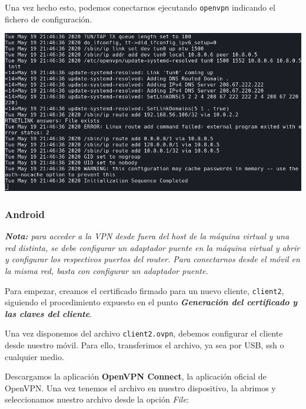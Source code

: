 \documentclass[11pt,a4paper]{article}
\begin{document}
\medskip

Una vez hecho esto, podemos conectarnos ejecutando \texttt{openvpn} indicando el fichero de configuración.

\medskip

\begin{center}
\includegraphics[scale=0.4]{log.png}
\end{center}

\medskip

\subsubsection{Android}

\textit{\textbf{Nota:} para acceder a la VPN desde fuera del host de la máquina virtual y una red distinta, se debe configurar un adaptador puente en la máquina virtual y abrir y configurar los respectivos puertos del router. Para conectarnos desde el móvil en la misma red, basta con configurar un adaptador puente.}

\bigskip

Para empezar, creamos el certificado firmado para un nuevo cliente, \texttt{client2}, siguiendo el procedimiento expuesto en el punto \textbf{\textit{Generación del certificado y las claves del cliente}}.

\medskip

Una vez disponemos del archivo \texttt{client2.ovpn}, debemos configurar el cliente desde nuestro móvil. Para ello, transferimos el archivo, ya sea por USB, ssh o cualquier medio.

\medskip

Descargamos la aplicación \textbf{OpenVPN Connect}, la aplicación oficial de OpenVPN. Una vez tenemos el archivo en nuestro dispositivo, la abrimos y seleccionamos nuestro archivo desde la opción \textit{File}:
\end{document}
